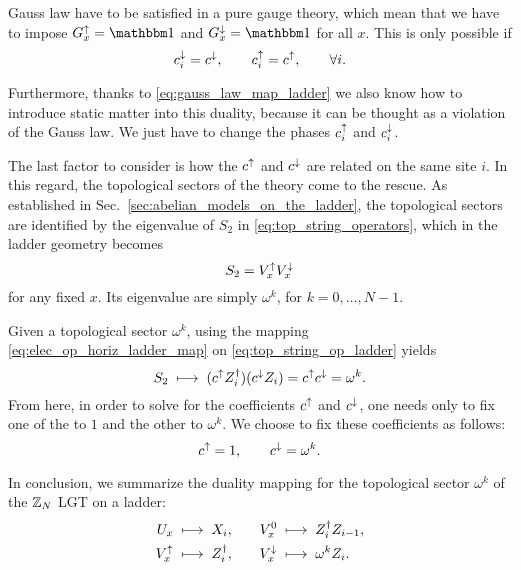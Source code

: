 Gauss law have to be satisfied in a pure gauge theory, which mean that we have to impose $G^\uparrow_x = \One$ and $G^\downarrow_x = \One$ for all $x$.
This is only possible if
\begin{equation}
    c^{\downarrow}_i = c^{\downarrow}, \qquad
    c^{\uparrow}_i = c^{\uparrow}, \qquad
    \forall i.
\end{equation}

Furthermore, thanks to \eqref{eq:gauss_law_map_ladder}  we also know how to introduce static matter into this duality, because it can be thought as a violation of the Gauss law.
We just have to change the phases $c^{\uparrow}_i$ and $c^{\downarrow}_i$.

The last factor to consider is how the $c^{\uparrow}$ and $c^{\downarrow}$ are related on the same site $i$.
In this regard, the topological sectors of the theory come to the rescue.
As established in Sec.~\ref{sec:abelian_models_on_the_ladder}, the topological sectors are identified by the eigenvalue of $S_2$ in \eqref{eq:top_string_operators}, which in the ladder geometry becomes
\begin{equation}
    S_2 = V^{\uparrow}_x V^{\downarrow}_x
    \label{eq:top_string_op_ladder}
\end{equation}
for any fixed $x$.
Its eigenvalue are simply $\omega^k$, for $k = 0, \dots, N-1$.

Given a topological sector $\omega^k$, using the mapping \eqref{eq:elec_op_horiz_ladder_map} on \eqref{eq:top_string_op_ladder} yields
\begin{equation}
    S_2 \; \longmapsto \; ( c^{\uparrow} Z^\dagger_i ) ( c^{\downarrow} Z_i ) = c^{\uparrow} c^{\downarrow} = \omega^k.
\end{equation}
From here, in order to solve for the coefficients $c^{\uparrow}$ and $c^{\downarrow}$, one needs only to fix one of the to $1$ and the other to $\omega^k$.
We choose to fix these coefficients as follows:
\begin{equation}
    c^{\uparrow} = 1, \qquad
    c^{\downarrow} = \omega^k.
\end{equation}

In conclusion, we summarize the duality mapping for the topological sector $\omega^k$ of the $\mathbb{Z}_N$ LGT on a ladder:
\begin{equation}
    \begin{aligned}
        U_x      & \; \longmapsto \; X_i, \quad &
        V^0_x    & \; \longmapsto \; Z^\dagger_i Z_{i-1}, \\
        V^{\uparrow}_x   & \; \longmapsto \; Z_i^\dagger, \quad &
        V^{\downarrow}_x & \; \longmapsto \; \omega^k Z_i.
    \end{aligned}
    \label{eq:ladder_duality}
\end{equation}

